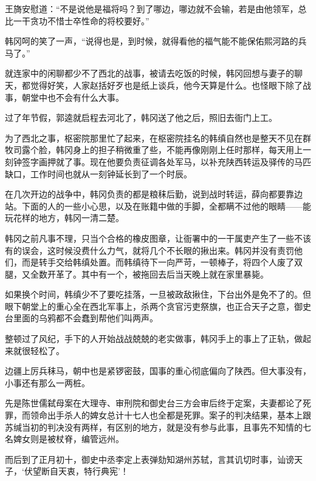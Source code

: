 王旖安慰道：“不是说他是福将吗？到了哪边，哪边就不会输，若是由他领军，总比一干贪功不惜士卒性命的将校要好。”

韩冈呵的笑了一声，“说得也是，到时候，就得看他的福气能不能保佑熙河路的兵马了。”

就连家中的闲聊都少不了西北的战事，被请去吃饭的时候，韩冈回想与妻子的聊天，都觉得好笑，人家赵括好歹也是纸上谈兵，他今天算是什么。也怪眼下除了战事，朝堂中也不会有什么大事。

过了年节假，郭逵就启程去河北了，韩冈送了他之后，照旧去衙门上工。

为了西北之事，枢密院那里忙了起来，在枢密院挂名的韩缜自然也是整天不见在群牧司露个脸，韩冈身上的担子稍微重了些，不能再像刚刚上任时那样，每天用上一刻钟签字画押就了事。现在他要负责征调各处军马，以补充陕西转运及驿传的马匹缺口，工作时间也就从一刻钟延长到了一个时辰。

在几次开边的战争中，韩冈负责的都是粮秣后勤，说到战时转运，薛向都要靠边站。下面的人的一些小心思，以及在账籍中做的手脚，全都瞒不过他的眼睛——能玩花样的地方，韩冈一清二楚。

韩冈之前凡事不理，只当个合格的橡皮图章，让衙署中的一干属吏产生了一些不该有的误会，这时候没费什么力气，就将几个不长眼的揪出来。韩冈并没有责罚他们，而是转手交给韩缜处置。而韩缜待下一向严苛，一顿棒子，将四个人废了双腿，又全数开革了。其中有一个，被拖回去后当天晚上就在家里暴毙。

如果换个时间，韩缜少不了要吃挂落，一旦被政敌揪住，下台出外是免不了的。但眼下朝堂上的重心全在西北军事上，杀两个贪官污吏祭旗，也正合天子之意，御史台里面的乌鸦都不会蠢到帮他们叫两声。

整顿过了风纪，手下的人开始战战兢兢的老实做事，韩冈手上的事上了正轨，做起来就很轻松了。

边疆上厉兵秣马，朝中也是紧锣密鼓，国事的重心彻底偏向了陕西。但大事没有，小事还有那么一两桩。

先是陈世儒弑母案在大理寺、审刑院和御史台三方会审后终于定案，夫妻都论了死罪，而领命出手杀人的婢女总计十七人也全都是死罪。案子的判决结果，基本上跟苏缄当初的判决没有两样，有区别的地方，就是没有参与此事，且事先不知情的七名婢女则是被杖脊，编管远州。

而后到了正月初十，御史中丞李定上表弹劾知湖州苏轼，言其讥切时事，讪谤天子，‘伏望断自天衷，特行典宪’！

